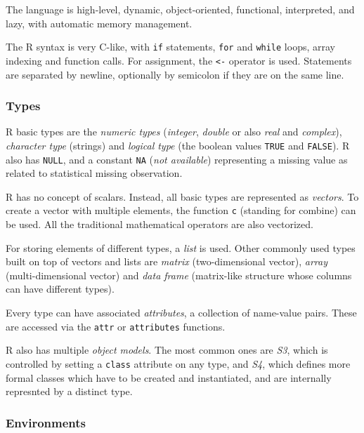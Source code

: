 The language is high-level, dynamic, object-oriented, functional, interpreted, and lazy, with automatic memory management.

The R syntax is very C-like, with \texttt{if} statements, \texttt{for} and \texttt{while} loops, array indexing and function calls. For assignment, the \texttt{<-} operator is used. Statements are separated by newline, optionally by semicolon if they are on the same line.

\subsubsection*{Types}

R basic types are the \textit{numeric types} (\textit{integer}, \textit{double} or also \textit{real} and \textit{complex}), \textit{character type} (strings) and \textit{logical type} (the boolean values \texttt{TRUE} and \texttt{FALSE}). R also has \texttt{NULL}, and a constant \texttt{NA} (\textit{not available}) representing a missing value as related to statistical missing observation.

R has no concept of scalars. Instead, all basic types are represented as \textit{vectors}. To create a vector with multiple elements, the function \texttt{c} (standing for combine) can be used. All the traditional mathematical operators are also vectorized.

For storing elements of different types, a \textit{list} is used. Other commonly used types built on top of vectors and lists are \textit{matrix} (two-dimensional vector), \textit{array} (multi-dimensional vector) and \textit{data frame} (matrix-like structure whose columns can have different types). \todoadd

Every type can have associated \textit{attributes}, a collection of name-value pairs. These are accessed via the \texttt{attr} or \texttt{attributes} functions.

R also has multiple \textit{object models}. The most common ones are \textit{S3}, which is controlled by setting a \texttt{class} attribute on any type, and \textit{S4}, which defines more formal classes which have to be created and instantiated, and are internally represnted by a distinct type.

\subsubsection*{Environments}

